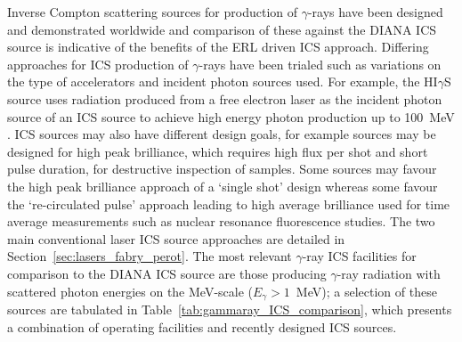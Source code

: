 \documentclass[../main.tex]{subfiles}
\begin{document}
Inverse Compton scattering sources for production of $\gamma$-rays have been designed and demonstrated worldwide and comparison of these against the DIANA ICS source is indicative of the benefits of the ERL driven ICS approach. Differing approaches for ICS production of $\gamma$-rays have been trialed such as variations on the type of accelerators and incident photon sources used. For example, the HI$\gamma$S source uses radiation produced from a free electron laser as the incident photon source of an ICS source to achieve high energy photon production up to 100~\si{\mega\electronvolt} \cite{weller2009research}. ICS sources may also have different design goals, for example sources may be designed for high peak brilliance, which requires high flux per shot and short pulse duration, for destructive inspection of samples. Some sources may favour the high peak brilliance approach of a `single shot' design whereas some favour the `re-circulated pulse' approach leading to high average brilliance used for time average measurements such as nuclear resonance fluorescence studies. The two main conventional laser ICS source approaches are detailed in Section~\ref{sec:lasers_fabry_perot}. The most relevant $\gamma$-ray ICS facilities for comparison to the DIANA ICS source are those producing $\gamma$-ray radiation with scattered photon energies on the \si{\mega\electronvolt}-scale ($E_{\gamma}>1$~\si{\mega\electronvolt}); a selection of these sources are tabulated in Table~\ref{tab:gammaray_ICS_comparison}, which presents a combination of operating facilities and recently designed ICS sources. 
\end{document}
